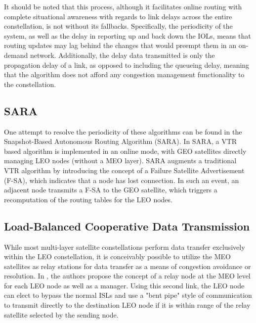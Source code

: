It should be noted that this process, although it facilitates online routing with complete situational awareness with regards to link delays across the entire constellation, is not without its fallbacks. Specifically, the periodicity of the system, as well as the delay in reporting up and back down the IOLs, means that routing updates may lag behind the changes that would preempt them in an on-demand network. Additionally, the delay data transmitted is only the propagation delay of a link, as opposed to including the queueing delay, meaning that the algorithm does not afford any congestion management functionality to the constellation.

\subsection{SARA}\label{subsec:sara}
One attempt to resolve the periodicity of these algorithms can be found in the Snapshot-Based Autonomous Routing Algorithm (SARA). In SARA, a VTR based algorithm is implemented in an online mode, with GEO satellites directly managing LEO nodes (without a MEO layer). SARA augments a traditional VTR algorithm by introducing the concept of a Failure Satellite Advertisement (F-SA), which indicates that a node has lost connection. In such an event, an adjacent node transmits a F-SA to the GEO satellite, which triggers a recomputation of the routing tables for the LEO nodes.

\subsection{Load-Balanced Cooperative Data Transmission}\label{subsec:loadBalanced}
While most multi-layer satellite constellations perform data transfer exclusively within the LEO constellation, it is conceivably possible to utilize the MEO satellites as relay stations for data transfer as a means of congestion avoidance or resolution. In \cite{li_load-balanced_2018}, the authors propose the concept of a relay node at the MEO level for each LEO node as well as a manager. Using this second link, the LEO node can elect to bypass the normal ISLs and use a "bent pipe" style of communication to transmit directly to the destination LEO node if it is within range of the relay satellite selected by the sending node.